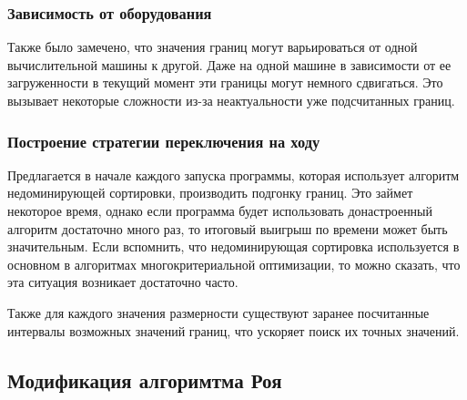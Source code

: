 
\subsubsection{Зависимость от оборудования}

Также было замечено, что значения границ могут варьироваться от одной вычислительной машины к другой. Даже на одной машине в зависимости от ее загруженности в текущий момент эти границы могут немного сдвигаться. Это вызывает некоторые сложности из-за неактуальности уже подсчитанных границ.

\subsubsection{Построение стратегии переключения на ходу}

Предлагается в начале каждого запуска программы, которая использует алгоритм недоминирующей сортировки, производить подгонку границ. Это займет некоторое время, однако если программа будет использовать донастроенный алгоритм достаточно много раз, то итоговый выигрыш по времени может быть значительным. Если вспомнить, что недоминирующая сортировка используется в основном в алгоритмах многокритериальной оптимизации, то можно сказать, что эта ситуация возникает достаточно часто.

Также для каждого значения размерности существуют заранее посчитанные интервалы возможных значений границ, что ускоряет поиск их точных значений.

\subsection{Модификация алгоримтма Роя}


